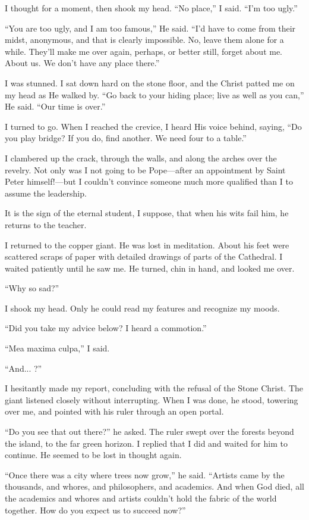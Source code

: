 I thought for a moment, then shook my head. ``No place,'' I said. ``I'm too ugly.''

``You are too ugly, and I am too famous,'' He said. ``I'd have to come from their midst, anonymous, and that is clearly impossible. No, leave them alone for a while. They'll make me over again, perhaps, or better still, forget about me. About us. We don't have any place there.''

I was stunned. I sat down hard on the stone floor, and the Christ patted me on my head as He walked by. ``Go back to your hiding place; live as well as you can,'' He said. ``Our time is over.''

I turned to go. When I reached the crevice, I heard His voice behind, saying, ``Do you play bridge? If you do, find another. We need four to a table.''

I clambered up the crack, through the walls, and along the arches over the revelry. Not only was I not going to be Pope—after an appointment by Saint Peter himself!—but I couldn't convince someone much more qualified than I to assume the leadership.

It is the sign of the eternal student, I suppose, that when his wits fail him, he returns to the teacher.

I returned to the copper giant. He was lost in meditation. About his feet were scattered scraps of paper with detailed drawings of parts of the Cathedral. I waited patiently until he saw me. He turned, chin in hand, and looked me over.

``Why so sad?''

I shook my head. Only he could read my features and recognize my moods.

``Did you take my advice below? I heard a commotion.''

``Mea maxima culpa,'' I said.

``And... ?''

I hesitantly made my report, concluding with the refusal of the Stone Christ. The giant listened closely without interrupting. When I was done, he stood, towering over me, and pointed with his ruler through an open portal.

``Do you see that out there?'' he asked. The ruler swept over the forests beyond the island, to the far green horizon. I replied that I did and waited for him to continue. He seemed to be lost in thought again.

``Once there was a city where trees now grow,'' he said. ``Artists came by the thousands, and whores, and philosophers, and academics. And when God died, all the academics and whores and artists couldn't hold the fabric of the world together. How do you expect us to succeed now?''

